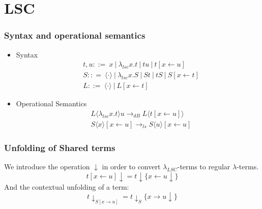 \documentclass{beamer}
\begin{document}
\section{LSC}
\begin{frame}
  \frametitle{Syntax and operational semantics}
\begin{itemize}
  \item Syntax
    \begin{equation}
    \begin{split}
      & t, u ::= \ x \ | \ \lambda_{lsc}x.t \ | \ tu \ | \ t[x \leftarrow u ] \\
      & S :: = \ \langle \cdot \rangle \ | \ \lambda_{lsc}x.S \ | \ St \ | \ tS \ | \ S[x \leftarrow t] \\
      & L ::= \ \langle \cdot \rangle \ | \ L[x \leftarrow t]
    \end{split}
  \end{equation}

  \item Operational Semantics
        \begin{equation}
          \begin{split}
            & L \langle \lambda_{lsc} x.t \rangle u \rightarrow_{dB} L \langle t [x \leftarrow u] \rangle \\
            & S \langle x \rangle [x \leftarrow u] \rightarrow_{ls} S \langle u \rangle [x \leftarrow u]
          \end{split}
        \end{equation}
\end{itemize}
\end{frame}
\begin{frame}
  \frametitle{Unfolding of Shared terms}
  We introduce the operation $\downarrow$ in order to convert $\lambda_{LSC}$-terms to regular $\lambda$-terms.
  \begin{equation}
  t[x \leftarrow u]\downarrow = t\downarrow \{ x \leftarrow u \downarrow \}
\end{equation}
And the contextual unfolding of a term:
\begin{equation}
  t \downarrow_{S[x \rightarrow u]} = t \downarrow_{S} \{ x \rightarrow u \downarrow \}
\end{equation}
\end{frame}
\end{document}
